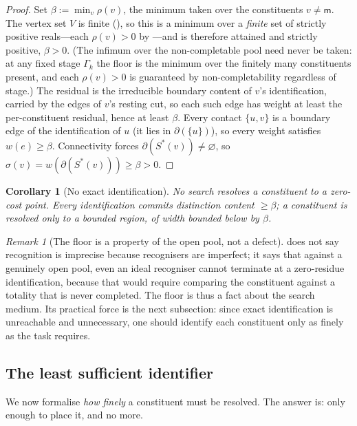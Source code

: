 \documentclass[11pt,twocolumn,a4paper]{article}
\theoremstyle{thmstyle}
\newtheorem{corollary}[theorem]{Corollary}
\theoremstyle{definition}
\theoremstyle{remark}
\newtheorem{remark}[theorem]{Remark}
\newcommand{\Gph}{\Gamma}
\newcommand{\V}{V}
\newcommand{\wt}{w}
\newcommand{\med}{\mathsf{m}}
\newcommand{\flo}{\beta}
\newcommand{\cut}{\partial}
\newcommand{\str}{\sigma}
\newcommand{\res}{\rho}
\begin{document}
\begin{proof}
Set $\flo:=\min_v\res(v)$, the minimum taken over the constituents $v\neq\med$.
The vertex set $\V$ is finite (), so this is a minimum over a
\emph{finite} set of strictly positive reals---each $\res(v)>0$ by
---and is therefore attained and strictly positive,
$\flo>0$. (The infimum over the non-completable pool need never be taken: at any
fixed stage $\Gph_k$ the floor is the minimum over the finitely many
constituents present, and each $\res(v)>0$ is guaranteed by non-completability
regardless of stage.) The residual is the irreducible boundary content of $v$'s
identification, carried by the edges of $v$'s resting cut, so each such edge has
weight at least the per-constituent residual, hence at least $\flo$. Every
contact $\{u,v\}$ is a boundary edge of the identification of $u$ (it lies in
$\cut(\{u\})$), so every weight satisfies $\wt(e)\ge\flo$. Connectivity forces
$\cut(S^{\ast}(v))\neq\varnothing$, so
$\str(v)=\wt(\cut(S^{\ast}(v)))\ge\flo>0$.
\end{proof}

\begin{corollary}[No exact identification]
\label{cor:no-point}
No search resolves a constituent to a zero-cost point. Every identification
commits distinction content $\ge\flo$; a constituent is resolved only to a
bounded region, of width bounded below by $\flo$.
\end{corollary}

\begin{remark}[The floor is a property of the open pool, not a defect]
\label{rem:floor-fact}
 does not say recognition is imprecise because recognisers are
imperfect; it says that against a genuinely open pool, even an ideal recogniser
cannot terminate at a zero-residue identification, because that would require
comparing the constituent against a totality that is never completed. The floor
is thus a fact about the search medium. Its practical force is the next
subsection: since exact identification is unreachable and unnecessary, one should
identify each constituent only as finely as the task requires.
\end{remark}

\subsection{The least sufficient identifier}

We now formalise \emph{how finely} a constituent must be resolved. The answer is:
only enough to place it, and no more.
\end{document}
